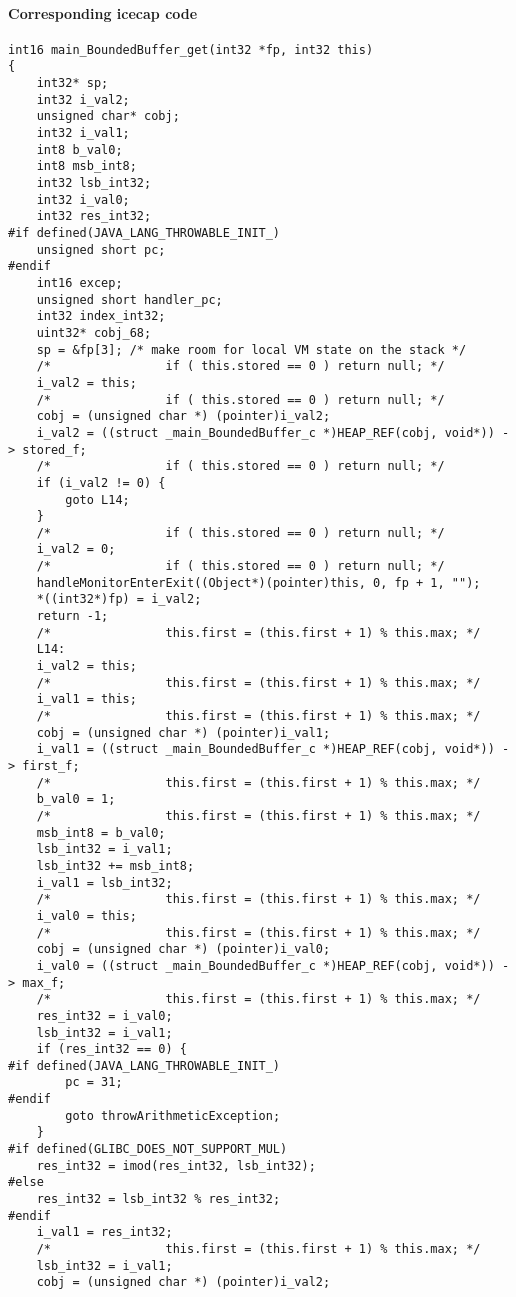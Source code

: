 \paragraph{Corresponding icecap code}\hfill
\begin{lstlisting}[firstnumber=55060]
int16 main_BoundedBuffer_get(int32 *fp, int32 this)
{
	int32* sp;
	int32 i_val2;
	unsigned char* cobj;
	int32 i_val1;
	int8 b_val0;
	int8 msb_int8;
	int32 lsb_int32;
	int32 i_val0;
	int32 res_int32;
#if defined(JAVA_LANG_THROWABLE_INIT_)
	unsigned short pc;
#endif
	int16 excep;
	unsigned short handler_pc;
	int32 index_int32;
	uint32* cobj_68;
	sp = &fp[3]; /* make room for local VM state on the stack */
	/*                if ( this.stored == 0 ) return null; */
	i_val2 = this;
	/*                if ( this.stored == 0 ) return null; */
	cobj = (unsigned char *) (pointer)i_val2;
	i_val2 = ((struct _main_BoundedBuffer_c *)HEAP_REF(cobj, void*)) -> stored_f;
	/*                if ( this.stored == 0 ) return null; */
	if (i_val2 != 0) {
		goto L14;
	}
	/*                if ( this.stored == 0 ) return null; */
	i_val2 = 0;
	/*                if ( this.stored == 0 ) return null; */
	handleMonitorEnterExit((Object*)(pointer)this, 0, fp + 1, "");
	*((int32*)fp) = i_val2;
	return -1;
	/*                this.first = (this.first + 1) % this.max; */
	L14:
	i_val2 = this;
	/*                this.first = (this.first + 1) % this.max; */
	i_val1 = this;
	/*                this.first = (this.first + 1) % this.max; */
	cobj = (unsigned char *) (pointer)i_val1;
	i_val1 = ((struct _main_BoundedBuffer_c *)HEAP_REF(cobj, void*)) -> first_f;
	/*                this.first = (this.first + 1) % this.max; */
	b_val0 = 1;
	/*                this.first = (this.first + 1) % this.max; */
	msb_int8 = b_val0;
	lsb_int32 = i_val1;
	lsb_int32 += msb_int8;
	i_val1 = lsb_int32;
	/*                this.first = (this.first + 1) % this.max; */
	i_val0 = this;
	/*                this.first = (this.first + 1) % this.max; */
	cobj = (unsigned char *) (pointer)i_val0;
	i_val0 = ((struct _main_BoundedBuffer_c *)HEAP_REF(cobj, void*)) -> max_f;
	/*                this.first = (this.first + 1) % this.max; */
	res_int32 = i_val0;
	lsb_int32 = i_val1;
	if (res_int32 == 0) {
#if defined(JAVA_LANG_THROWABLE_INIT_)
		pc = 31;
#endif
		goto throwArithmeticException;
	}
#if defined(GLIBC_DOES_NOT_SUPPORT_MUL)
	res_int32 = imod(res_int32, lsb_int32);
#else
	res_int32 = lsb_int32 % res_int32;
#endif
	i_val1 = res_int32;
	/*                this.first = (this.first + 1) % this.max; */
	lsb_int32 = i_val1;
	cobj = (unsigned char *) (pointer)i_val2;

\end{lstlisting}
